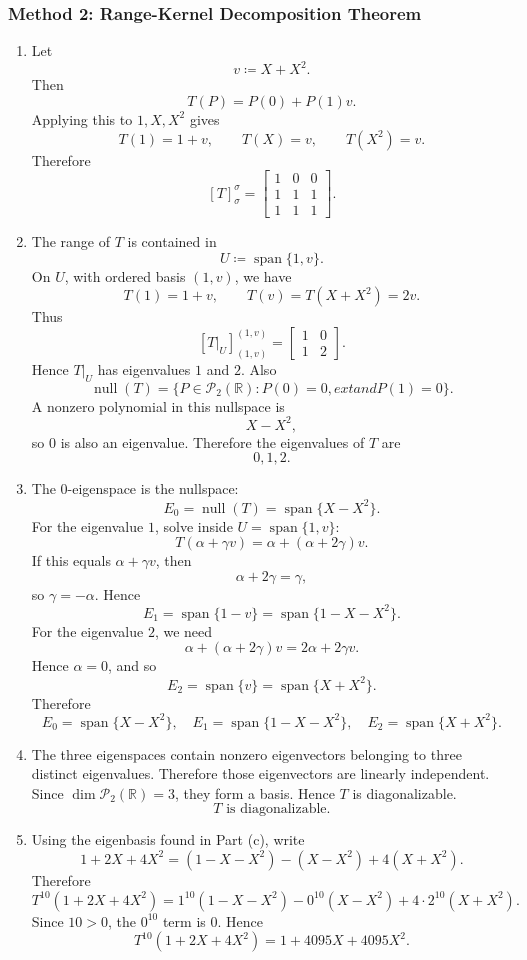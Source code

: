 \documentclass[12pt]{article}
\newcommand{\R}{\mathbb{R}}
\newcommand{\cP}{\mathcal{P}}
\newcommand{\df}{\coloneqq}
\newcommand{\Span}{\operatorname{span}}
\newcommand{\Null}{\operatorname{null}}
\begin{document}
\subsubsection{Method 2: Range-Kernel Decomposition Theorem}
\begin{enumerate}[label=(\alph*)]
  \item Let
  \[
    v\df X+X^2.
  \]
  Then
  \[
    T(P)=P(0)+P(1)v.
  \]
  Applying this to $1,X,X^2$ gives
  \[
    T(1)=1+v,
    \qquad
    T(X)=v,
    \qquad
    T(X^2)=v.
  \]
  Therefore
  \[
    \boxed{[T]_{\sigma}^{\sigma}
    =
    \begin{bmatrix}
      1&0&0\\
      1&1&1\\
      1&1&1
    \end{bmatrix}.}
  \]

  \item The range of $T$ is contained in
  \[
    U\df\Span\{1,v\}.
  \]
  On $U$, with ordered basis $(1,v)$, we have
  \[
    T(1)=1+v,
    \qquad
    T(v)=T(X+X^2)=2v.
  \]
  Thus
  \[
    [T|_U]_{(1,v)}^{(1,v)}
    =
    \begin{bmatrix}
      1&0\\
      1&2
    \end{bmatrix}.
  \]
  Hence $T|_U$ has eigenvalues $1$ and $2$. Also
  \[
    \Null(T)=\{P\in\cP_2(\R):P(0)=0,	ext{ and }P(1)=0\}.
  \]
  A nonzero polynomial in this nullspace is
  \[
    X-X^2,
  \]
  so $0$ is also an eigenvalue. Therefore the eigenvalues of $T$ are
  \[
    \boxed{0,1,2.}
  \]

  \item The $0$-eigenspace is the nullspace:
  \[
    E_0=\Null(T)=\Span\{X-X^2\}.
  \]
  For the eigenvalue $1$, solve inside $U=\Span\{1,v\}$:
  \[
    T(\alpha+\gamma v)=\alpha+(\alpha+2\gamma)v.
  \]
  If this equals $\alpha+\gamma v$, then
  \[
    \alpha+2\gamma=\gamma,
  \]
  so $\gamma=-\alpha$. Hence
  \[
    E_1=\Span\{1-v\}=\Span\{1-X-X^2\}.
  \]
  For the eigenvalue $2$, we need
  \[
    \alpha+(\alpha+2\gamma)v=2\alpha+2\gamma v.
  \]
  Hence $\alpha=0$, and so
  \[
    E_2=\Span\{v\}=\Span\{X+X^2\}.
  \]
  Therefore
  \[
    \boxed{
    E_0=\Span\{X-X^2\},\quad
    E_1=\Span\{1-X-X^2\},\quad
    E_2=\Span\{X+X^2\}.}
  \]

  \item The three eigenspaces contain nonzero eigenvectors belonging to three distinct eigenvalues. Therefore those eigenvectors are linearly independent. Since $\dim\cP_2(\R)=3$, they form a basis. Hence $T$ is diagonalizable.
  \[
    \boxed{T\text{ is diagonalizable}.}
  \]

  \item Using the eigenbasis found in Part (c), write
  \[
    1+2X+4X^2
    =(1-X-X^2)-(X-X^2)+4(X+X^2).
  \]
  Therefore
  \[
    T^{10}(1+2X+4X^2)
    =1^{10}(1-X-X^2)-0^{10}(X-X^2)+4\cdot 2^{10}(X+X^2).
  \]
  Since $10>0$, the $0^{10}$ term is $0$. Hence
  \[
    \boxed{T^{10}(1+2X+4X^2)=1+4095X+4095X^2.}
  \]
\end{enumerate}
\end{document}
